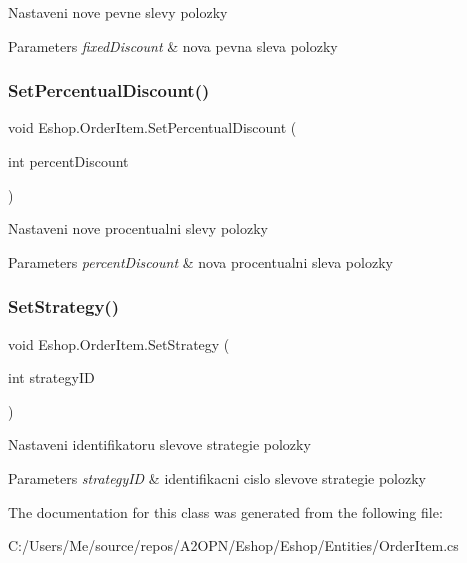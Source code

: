 Nastaveni nove pevne slevy polozky 


\begin{DoxyParams}{Parameters}
{\em fixed\+Discount} & nova pevna sleva polozky\\
\hline
\end{DoxyParams}
\mbox{\label{class_eshop_1_1_order_item_a75b364576208053e051406bae275cd22}} 
\subsubsection{\texorpdfstring{SetPercentualDiscount()}{SetPercentualDiscount()}}
{\footnotesize\ttfamily void Eshop.\+Order\+Item.\+Set\+Percentual\+Discount (\begin{DoxyParamCaption}\item[{int}]{percent\+Discount }\end{DoxyParamCaption})}



Nastaveni nove procentualni slevy polozky 


\begin{DoxyParams}{Parameters}
{\em percent\+Discount} & nova procentualni sleva polozky\\
\hline
\end{DoxyParams}
\mbox{\label{class_eshop_1_1_order_item_a8c45b7ee6da0b23934c7977cadba9017}} 
\subsubsection{\texorpdfstring{SetStrategy()}{SetStrategy()}}
{\footnotesize\ttfamily void Eshop.\+Order\+Item.\+Set\+Strategy (\begin{DoxyParamCaption}\item[{int}]{strategy\+ID }\end{DoxyParamCaption})}



Nastaveni identifikatoru slevove strategie polozky 


\begin{DoxyParams}{Parameters}
{\em strategy\+ID} & identifikacni cislo slevove strategie polozky\\
\hline
\end{DoxyParams}


The documentation for this class was generated from the following file\+:\begin{DoxyCompactItemize}
\item 
C\+:/\+Users/\+Me/source/repos/\+A2\+O\+P\+N/\+Eshop/\+Eshop/\+Entities/Order\+Item.\+cs\end{DoxyCompactItemize}
